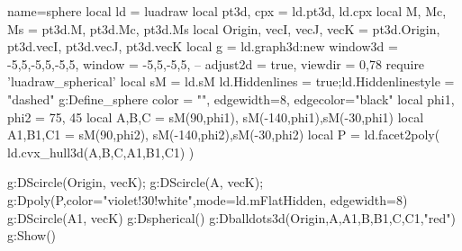 \documentclass{standalone}
\begin{document}
    \begin{luadraw}{name=sphere}
    local ld = luadraw
    local pt3d, cpx = ld.pt3d, ld.cpx
    local M, Mc, Ms = pt3d.M, pt3d.Mc, pt3d.Ms
    local Origin, vecI, vecJ, vecK = pt3d.Origin, pt3d.vecI, pt3d.vecJ, pt3d.vecK
    local g = ld.graph3d:new{
        window3d = {-5,5,-5,5,-5,5},
        window = {-5,5,-5,5},
        -- adjust2d = true, 
        viewdir = {0,78}
    }
    require 'luadraw_spherical'
    local sM = ld.sM
    ld.Hiddenlines = true;ld.Hiddenlinestyle = "dashed"
    g:Define_sphere{ color = "", edgewidth=8, edgecolor="black" }
    local phi1, phi2 = 75, 45
    local A,B,C = sM(90,phi1), sM(-140,phi1),sM(-30,phi1)
    local A1,B1,C1 = sM(90,phi2), sM(-140,phi2),sM(-30,phi2)
    local P = ld.facet2poly( ld.cvx_hull3d({A,B,C,A1,B1,C1}) )

    g:DScircle({Origin, vecK});
    g:DScircle({A, vecK});
    g:Dpoly(P,{color="violet!30!white",mode=ld.mFlatHidden, edgewidth=8})
    g:DScircle({A1, vecK})
    g:Dspherical()
    g:Dballdots3d({Origin,A,A1,B,B1,C,C1},"red")
    g:Show()
\end{luadraw}
\end{document}
